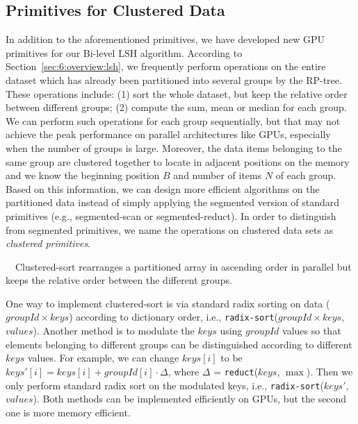 \subsection{Primitives for Clustered Data}
In addition to the aforementioned primitives, we have developed new GPU primitives for our Bi-level LSH algorithm. According to Section~\ref{sec:6:overview:lsh}, we frequently perform operations
on the entire dataset which has already been partitioned into several groups by the RP-tree. These operations include: (1) sort the whole
dataset, but keep the relative order between different groups; (2) compute the sum, mean or median for each group. We can perform such operations for each group sequentially, but that may not achieve the peak performance on parallel architectures like GPUs, especially when the number of groups is large. Moreover, the data items belonging to the same group are clustered together to locate in adjacent positions on the memory and we know the beginning position $B$ and number of items $N$ of each group. Based on this information, we can design more efficient algorithms on the partitioned data instead of simply applying the segmented version of standard primitives (e.g., segmented-scan or segmented-reduct). In order to distinguish from segmented primitives, we name the operations on clustered data sets as \emph{clustered primitives}.

 \ \ Clustered-sort rearranges a partitioned array in ascending order in parallel but keeps the relative order between the different groups.

\noindent {}

One way to implement clustered-sort is via standard radix sorting on data ($groupId \times keys$) according to dictionary order, i.e., \texttt{radix-sort}($groupId \times keys$, $values$). Another method is to modulate the $keys$ using $groupId$ values so that elements belonging to different groups can be distinguished according to different $keys$ values. For example, we can change $keys[i]$ to be $keys'[i] = keys[i] + groupId[i] \cdot \Delta$, where $\Delta$ = \texttt{reduct}($keys$, $\max$). Then we only perform standard radix sort on the modulated keys, i.e., \texttt{radix-sort}($keys'$, $values$). Both methods can be implemented efficiently on GPUs, but the second one is more memory efficient.

